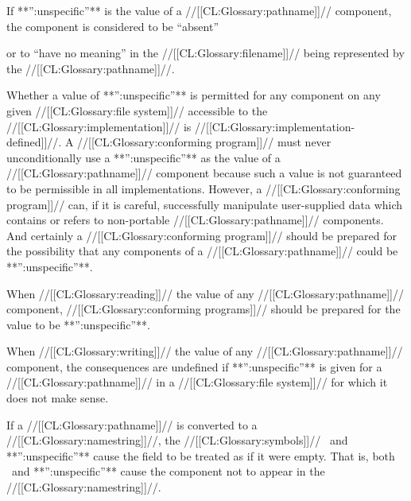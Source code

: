 \endsubsubsubsection%



If **'':unspecific''** is the value of a //[[CL:Glossary:pathname]]// component,
the component is considered to be ``absent'' 

or to ``have no meaning''
in the //[[CL:Glossary:filename]]// being represented by the //[[CL:Glossary:pathname]]//.

Whether a value of **'':unspecific''** is permitted for any component
on any given //[[CL:Glossary:file system]]// accessible to the //[[CL:Glossary:implementation]]//
is //[[CL:Glossary:implementation-defined]]//.
A //[[CL:Glossary:conforming program]]// must never unconditionally use a
**'':unspecific''** as the value of a //[[CL:Glossary:pathname]]// component because
such a value is not guaranteed to be permissible in all implementations.
However, a //[[CL:Glossary:conforming program]]// can, if it is careful, 
successfully manipulate user-supplied data 
which contains or refers to non-portable //[[CL:Glossary:pathname]]// components.
And certainly a //[[CL:Glossary:conforming program]]// should be prepared for the
possibility that any components of a //[[CL:Glossary:pathname]]// could be **'':unspecific''**.


When //[[CL:Glossary:reading]]// the value of any //[[CL:Glossary:pathname]]// component,
//[[CL:Glossary:conforming programs]]// should be prepared for the value to be **'':unspecific''**.


When //[[CL:Glossary:writing]]// the value of any //[[CL:Glossary:pathname]]// component,
the consequences are undefined if **'':unspecific''** is given 
for a //[[CL:Glossary:pathname]]// in a //[[CL:Glossary:file system]]// for which it does not make sense.









If a //[[CL:Glossary:pathname]]// is converted to a //[[CL:Glossary:namestring]]//, 
the //[[CL:Glossary:symbols]]// \nil\ and **'':unspecific''**
cause the field to be treated as if it were empty.
That is,
both \nil\ and **'':unspecific''** 
cause the component not to appear in the //[[CL:Glossary:namestring]]//.

